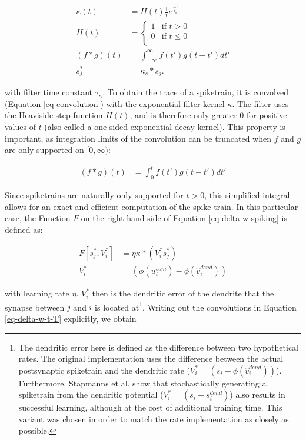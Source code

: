 \begin{align}
  \kappa(t)     & = H(t) \frac{1}{t}e^{\frac{-t}{\tau_{\kappa}}}                        \\
  H(t)          & =
  \begin{cases}
    1 & \text{if $t > 0$}    \\
    0 & \text{if $t \leq 0$} \\
  \end{cases}                                                              \\
  (f \ast g)(t) & = \int_{- \infty }^{\infty} f(t') g(t-t') d t' \label{eq-convolution} \\
  s_j^\ast      & = \kappa_s \ast s_j. \label{eq-spike-trace}
\end{align}

with filter time constant $\tau_\kappa$. To obtain the trace of a spiketrain, it is convolved (Equation
\ref{eq-convolution}) with the exponential filter kernel $\kappa$. The filter uses the Heaviside step function $H(t)$,
and is therefore only greater $0$ for positive values of $t$ (also called a one-sided exponential decay kernel). This
property is important, as integration limits of the convolution can be truncated when $f$ and $g$ are only supported on
$[0,\infty)$:

\begin{align}
  (f \ast g)(t) & = \int_{0}^{t} f(t') g(t-t') d t'
\end{align}

Since spiketrains are naturally only supported for $t>0$, this simplified integral allows for an exact and efficient
computation of the spike train. In this particular case, the Function $F$ on the right hand side of Equation
\ref{eq-delta-w-spiking} is defined as:

\begin{align}
  F[s_j^\ast, V_i^\ast] & = \eta \kappa \ast (V_i^\ast s_j^\ast)        \\
  V_i^\ast              & = (\phi(u_i^{som}) - \phi(\hat{v}_i^{dend}) )
\end{align}

 with learning rate $\eta$.
$V_i^\ast$ then is the dendritic error of the dendrite that the synapse between $j$ and $i$ is located at\footnote{The
dendritic error here is defined as the difference between two hypothetical rates. The original implementation uses the
difference between the actual postsynaptic spiketrain and the dendritic rate ($V_i^\ast = (s_i - \phi(\hat{v}_i^{dend})
  )$). Furthermore, Stapmanns et al. show that stochastically generating a spiketrain from the dendritic potential
($V_i^\ast = (s_i - s_i^{dend})$) also results in successful learning, although at the cost of additional training time.
This variant was chosen in order to match the rate implementation as closely as possible.}. Writing out the convolutions
in Equation \ref{eq-delta-w-t-T} explicitly, we obtain

